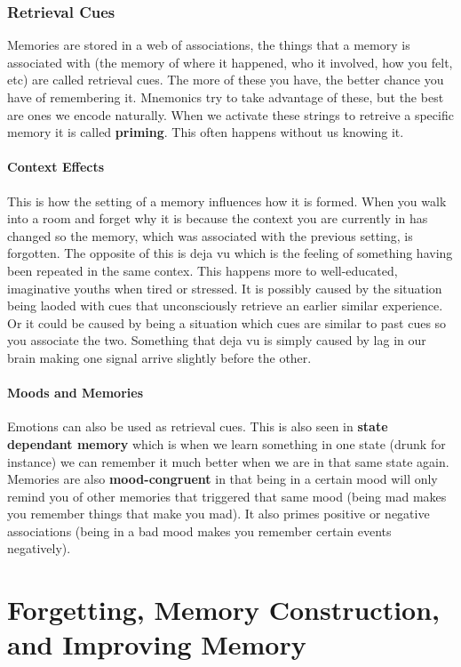 \documentclass[12pt]{article}
\begin{document}
\section*{Retrieval Cues} 
Memories are stored in a web of associations, the things that a memory is associated with (the memory of where it happened, who it involved, how you felt, etc) are called retrieval cues. The more of these you have, the better chance you have of remembering it. Mnemonics try to take advantage of these, but the best are ones we encode naturally. When we activate these strings to retreive a specific memory it is called \textbf{priming}. This often happens without us knowing it. 
\subsection*{Context Effects} This is how the setting of a memory influences how it is formed. When you walk into a room and forget why it is because the context you are currently in has changed so the memory, which was associated with the previous setting, is forgotten. The opposite of this is deja vu which is the feeling of something having been repeated in the same contex. This happens more to well-educated, imaginative youths when tired or stressed. It is possibly caused by the situation being laoded with cues that unconsciously retrieve an earlier similar experience. Or it could be caused by being a situation which cues are similar to past cues so you associate the two. Something that deja vu is simply caused by lag in our brain making one signal arrive slightly before the other.
\subsection*{Moods and Memories} Emotions can also be used as retrieval cues. This is also seen in \textbf{state dependant memory} which is when we learn something in one state (drunk for instance) we can remember it much better when we are in that same state again. Memories are also \textbf{mood-congruent} in that being in a certain mood will only remind you of other memories that triggered that same mood (being mad makes you remember things that make you mad). It also primes positive or negative associations (being in a bad mood makes you remember certain events negatively). 

\part*{Forgetting, Memory Construction, and Improving Memory} 
\end{document}
